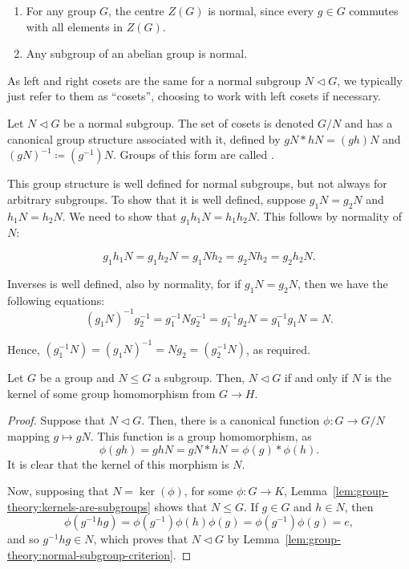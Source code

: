 \begin{example}\label{ex:group-theory:normal-subgroups}
  \begin{enumerate}
  \item For any group \(G\), the centre \(Z(G)\) is normal, since every \(g \in G\) commutes with all elements in \(Z(G)\).
  \item Any subgroup of an abelian group is normal.
  \end{enumerate}
\end{example}

As left and right cosets are the same for a normal subgroup \(N \triangleleft G\), we typically just refer to them as ``cosets'', choosing to work with left cosets if necessary.

\begin{definition}
  \label{def:group-theory:quotient-group}
  Let \(N \triangleleft G\) be a normal subgroup. The set of cosets is denoted \(G / N\) and has a canonical group structure associated with it, defined by \(gN * hN = (gh)N\) and \((gN)^{-1} \coloneqq (g^{-1})N\). Groups of this form are called .
\end{definition}

This group structure is well defined for normal subgroups, but not always for arbitrary subgroups.
%
To show that it is well defined, suppose \(g_{1}N = g_{2}N\) and \(h_{1}N = h_{2}N\).
%
We need to show that \(g_{1}h_{1}N = h_{1}h_{2}N\).
%
This follows by normality of \(N\):

\[g_{1}h_{1} N = g_{1} h_{2}N =g_{1}Nh_{2} = g_{2}Nh_{2} = g_{2}h_{2}N.\]

Inverses is well defined, also by normality, for if \(g_{1}N = g_{2}N\), then we have the following equations:
\[(g_{1}N)^{-1}g^{-1}_{2} = g_{1}^{-1}Ng^{-1}_{2} = g_{1}^{-1}g_{2}N = g^{-1}_{1}g_{1}N = N.\]

Hence, \((g^{-1}_{1}N) = (g_{1}N)^{-1} = Ng_{2} = (g^{-1}_{2}N)\), as required.


\begin{theorem}
  Let \(G\) be a group and \(N \leq G\) a subgroup.
  Then, \(N \triangleleft G\) if and only if \(N\) is the kernel of some group homomorphism from \(G \to H\).
\end{theorem}

\begin{proof}
  Suppose that \(N \triangleleft G\).
  Then, there is a canonical function \(\phi: G \to G/N\) mapping \(g \mapsto gN\).
  This function is a group homomorphism, as
  \[\phi(gh) = ghN = gN * hN = \phi(g) * \phi(h). \]
  It is clear that the kernel of this morphism is \(N\).

  Now, supposing that \(N = \ker(\phi)\), for some \(\phi : G \to K\), Lemma~\ref{lem:group-theory:kernels-are-subgroups} shows that \(N \leq G\).
  If \(g \in G\) and \(h \in N\), then
  \[\phi(g^{-1}h g) = \phi(g^{-1}) \phi(h) \phi(g) = \phi(g^{-1})\phi(g) = e,\]
  and so \(g^{-1}h g \in N\), which proves that \(N \triangleleft G\) by Lemma~\ref{lem:group-theory:normal-subgroup-criterion}.
\end{proof}



